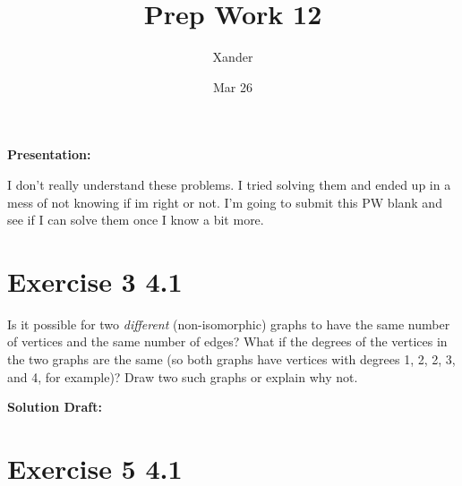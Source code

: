 \documentclass{article}
\title{Prep Work 12}
\author{Xander}
\date{Mar 26}
\begin{document}
\maketitle
\noindent\textbf{Presentation: } 

I don't really understand these problems. I tried solving them and ended up in a mess of not knowing if im right or not.
I'm going to submit this PW blank and see if I can solve them once I know a bit more.

\section*{Exercise 3 4.1}  

Is it possible for two \emph{different} (non-isomorphic) graphs to have the same number of vertices and the same number of edges? What if the degrees of the vertices in the two graphs are the same (so both graphs have vertices with degrees 1, 2, 2, 3, and 4, for example)? Draw two such graphs or explain why not.

\vspace{0.5cm}
\noindent\textbf{Solution Draft:} 
\vspace{0.2cm}



\section*{Exercise 5 4.1}  
\end{document}
